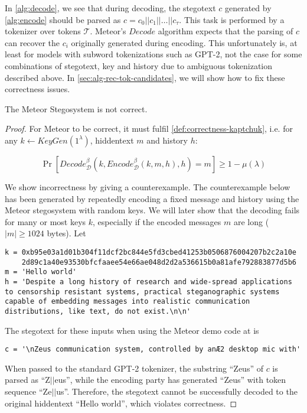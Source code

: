 In \autoref{alg:decode}, we see that during decoding, the stegotext $c$ generated by \autoref{alg:encode} should be parsed as $c = c_0 ||c_1 || \dots || c_{\tau}$.
This task is performed by a tokenizer over tokens $\mathcal{T}$.
Meteor's $Decode$ algorithm expects that the parsing of $c$ can recover the $c_i$ originally generated during encoding.
This unfortunately is, at least for models with subword tokenizations such as GPT-2, not the case for some combinations of stegotext, key and history due to ambiguous tokenization described above.
In \autoref{sec:alg-rec-tok-candidates}, we will show how to fix these correctness issues.

\begin{theorem}
The Meteor Stegosystem is not correct.
\end{theorem}

\begin{proof}
For Meteor to be correct, it must fulfil \autoref{def:correctness-kaptchuk}, i.e. for any $k \leftarrow KeyGen(1^\lambda)$, hiddentext $m$ and history $h$:

$$\mathop{Pr}[Decode_{\mathcal{D}}^\beta(k, Encode_{\mathcal{D}}^\beta(k, m, h), h) = m] \geq 1 - \mu(\lambda)$$

We show incorrectness by giving a counterexample. 
The counterexample below has been generated by repeatedly encoding a fixed message and history using the Meteor stegosystem with random keys.
We will later show that the decoding fails for many or most keys $k$, especially if the encoded messages $m$ are long ($|m| \geq 1024$ bytes).
Let

\begin{lstlisting}[breaklines]
k = 0xb95e03a1d01b304f11dcf2bc844e5fd3cbed41253b0506876004207b2c2a10e
    2d89c1a40e93530bfcfaaee54e66ae048d2d2a536615b0a81afe792883877d5b6
m = 'Hello world'
h = 'Despite a long history of research and wide-spread applications to censorship resistant systems, practical steganographic systems capable of embedding messages into realistic communication distributions, like text, do not exist.\n\n'
\end{lstlisting}

The stegotext for these inputs when using the Meteor demo code at \cite{MeteorDemo2021} is

\begin{lstlisting}
c = '\nZeus communication system, controlled by anÆ2 desktop mic with'
\end{lstlisting}

When passed to the standard GPT-2 tokenizer, the substring ``Zeus'' of $c$ is parsed as ``Z$||$eus'', while the encoding party has generated ``Zeus'' with token sequence ``Ze$||$us''.
Therefore, the stegotext cannot be successfully decoded to the original hiddentext ``Hello world'', which violates correctness.
\end{proof}

